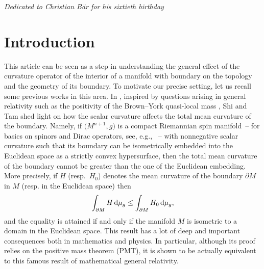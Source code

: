 \documentclass[pdftex]{sigma}
\numberwithin{equation}{section}
\begin{document}


\begin{flushright}
{\it Dedicated to Christian B\"ar for his sixtieth birthday}
\end{flushright}

\renewcommand{\thefootnote}{\arabic{footnote}}
\setcounter{footnote}{0}

\section{Introduction}%

This article can be seen as a step in understanding the general effect of the curvature operator of the interior of a ma\-ni\-fold with boundary on the to\-po\-lo\-gy and
the geo\-me\-try of its boundary.
To motivate our precise setting, let us recall some previous
works in this area.
In \cite{ShiTam02}, inspired by questions arising in general relativity such as the
po\-si\-ti\-vi\-ty of the Brown--York quasi-local mass \cite{BY}, Shi and Tam shed light
on how the scalar curvature affects the total mean curvature of the boundary.
Namely, if $\big(M^{n+1},g\big)$ is a compact Riemannian spin ma\-ni\-fold~-- for basics on spinors and Dirac operators, see, e.g., \cite{BHMM,Friedrichbook2000,GinsurveyDirac,LawsonMichelsohn89}~--
with nonnegative scalar curvature such that its boundary can be isometrically
embedded into the Euclidean space as a strictly convex hypersurface, then the
total mean curvature of the boundary cannot be greater than the one of the
Euclidean embedding.
More precisely, if $H$ (resp.~$H_0$) denotes the mean curvature of the boundary $\partial M$ in $M$
(resp. in the Euclidean space) then
\begin{equation}\label{ShiTamintro}
\int_{\partial M}H\,{\rm d}\mu_g\leq \int_{\partial M} H_0 \,{\rm d}\mu_g,
\end{equation}
and the equality is attained if and only if the ma\-ni\-fold $M$ is isometric to a
domain in the Euclidean space.
This result  has a lot of deep and important consequences both in mathematics
and physics.
In particular, although its proof relies on the positive mass theorem (PMT), it
is shown to be actually equivalent to this famous result of ma\-the\-ma\-ti\-cal general
relativity.
\end{document}
